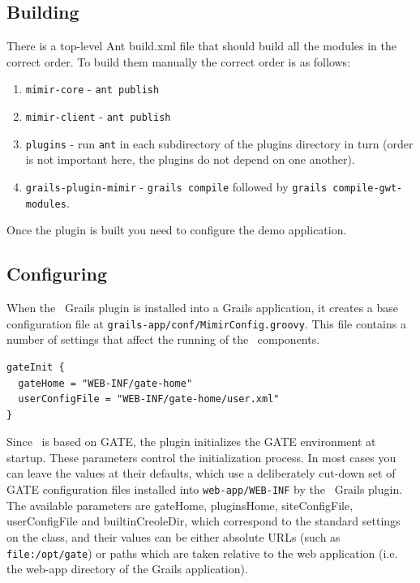 \subsection{Building}

There is a top-level Ant build.xml file that should build all the modules in
the correct order.  To build them manually the correct order is as follows:
\begin{enumerate}
\item {\tt mimir-core} - {\tt ant publish}
\item {\tt mimir-client} - {\tt ant publish}
\item {\tt plugins} - run {\tt ant} in each subdirectory of the plugins
  directory in turn (order is not important here, the plugins do not depend on
  one another).
\item {\tt grails-plugin-mimir} - {\tt grails compile} followed by {\tt grails
  compile-gwt-modules}.
\end{enumerate}

Once the plugin is built you need to configure the demo application.

\subsection{Configuring}\label{sec:admin:config}

When the \Mimir\ Grails plugin is installed into a Grails application, it
creates a base configuration file at {\tt grails-app/conf/MimirConfig.groovy}.
This file contains a number of settings that affect the running of the \Mimir\
components.

\begin{lstlisting}
gateInit {
  gateHome = "WEB-INF/gate-home"
  userConfigFile = "WEB-INF/gate-home/user.xml"
}
\end{lstlisting}

Since \Mimir\ is based on GATE, the plugin initializes the GATE environment at
startup.  These parameters control the initialization process.  In most cases
you can leave the values at their defaults, which use a deliberately cut-down
set of GATE configuration files installed into {\tt web-app/WEB-INF} by the
\Mimir\ Grails plugin.  The available parameters are gateHome, pluginsHome,
siteConfigFile, userConfigFile and builtinCreoleDir, which correspond to the
standard settings on the
class, and their values can be either absolute URLs (such as
\verb|file:/opt/gate|) or paths which are taken relative to the web application
(i.e. the web-app directory of the Grails application).

